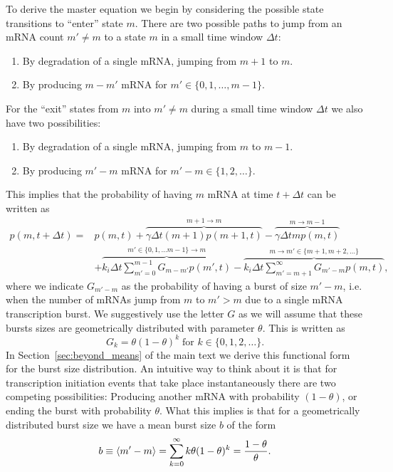 To derive the master equation we begin by considering the possible state
transitions to ``enter'' state $m$. There are two possible paths to jump from an
mRNA count $m' \neq m$ to a state $m$ in a small time window $\Delta t$:
\begin{enumerate}
        \item By degradation of a single mRNA, jumping from $m+1$ to $m$.
        \item By producing $m-m'$ mRNA for $m' \in \{0, 1, \ldots, m-1\}$.
\end{enumerate}
For the ``exit'' states from $m$ into $m' \neq m$ during a small time window
$\Delta t$ we also have two possibilities:
\begin{enumerate}
        \item By degradation of a single mRNA, jumping from $m$ to $m-1$.
        \item By producing $m'-m$ mRNA for $m'-m \in \{1, 2, \ldots\}$.
\end{enumerate}
This implies that the probability of having $m$ mRNA at time $t + \Delta t$ can
be written as
\begin{equation}
\begin{split}
p(m, t + \Delta t) = &p(m, t)
+ \overbrace{\gamma \Delta t (m + 1) p(m + 1, t)}^{m + 1 \rightarrow m}
- \overbrace{\gamma \Delta t m p(m, t)}^{m \rightarrow m - 1} \\
&+ \overbrace{k_i \Delta t \sum_{m'=0}^{m-1} G_{m-m'} p(m', t)}^
{m'\in \{0, 1, \ldots m-1\} \rightarrow m}
- \overbrace{k_i \Delta t \sum_{m'=m + 1}^{\infty} G_{m'-m} p(m, t)}^
{m \rightarrow m'\in \{m+1, m+2, \ldots\}},
\end{split}
\label{eq:si_master_deltat}
\end{equation}
where we indicate $G_{m'-m}$ as the probability of having a burst of size
$m'-m$, i.e. when the number of mRNAs jump from $m$ to $m' > m$ due to a single
mRNA transcription burst. We suggestively use the letter $G$ as we will assume
that these bursts sizes are geometrically distributed with parameter $\theta$.
This is written as
\begin{equation}
G_{k} = \theta (1 - \theta)^k\; \text{for } k \in \{0, 1, 2, \ldots \}.
\end{equation}
In Section~\ref{sec:beyond_means} of the main text we derive this functional
form for the burst size distribution. An intuitive way to think about it is that
for transcription initiation events that take place instantaneously there are
two competing possibilities: Producing another mRNA with probability $(1 -
\theta)$, or ending the burst with probability $\theta$. What this implies is
that for a geometrically distributed burst size we have a mean burst size $b$ of
the form
\begin{equation}
b \equiv \left\langle m' - m \right\rangle 
= \sum_{k=0}^\infty k \theta (1 - \theta)^k = {1 - \theta \over \theta}.
\end{equation}

